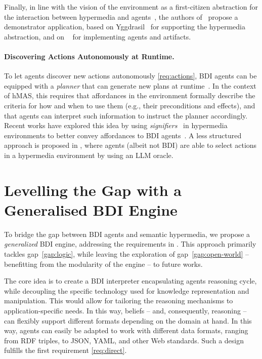 \documentclass[
]{ceurart}
\begin{document}
Finally,
in line with the vision of the environment as a first-citizen abstraction for the interaction between hypermedia and agents~\cite{DBLP:conf/www/CharpenayZLB22},
the authors of~\cite{DBLP:conf/emas/CiorteaBR18} propose a demonstrator application,
based on Yggdrasil~\cite{ciortea2018emas} for supporting the hypermedia abstraction,
and on \jacamo{}~\cite{BOISSIER2013747} for implementing agents and artifacts.

\paragraph{Discovering Actions Autonomously at Runtime.}

To let agents discover new actions autonomously \ref{req:actions},
\ac{BDI} agents can be equipped with a \emph{planner} that can generate new plans at runtime~\cite{MeneguzziS15}.
%
In the context of \ac{hMAS}, 
this requires that affordances in the environment 
formally describe the criteria for how and when to use them 
(e.g., their preconditions and effects),
and that agents can interpret such information to instruct the planner accordingly.
%
Recent works have explored this idea by using \emph{signifiers}~\cite{vachtsevanou2023atal} in hypermedia environments to better convey affordances to \ac{BDI} agents~\cite{vachtsevanou2024atal}.
%
A less structured approach is proposed in \cite{10.1145/3603163.3609077,schmid2024kgswc},
where agents (albeit not \ac{BDI}) are able to select actions in a hypermedia environment by using an \ac{LLM} oracle.

\section{Levelling the Gap with a Generalised \ac{BDI} Engine}
\label{sec:generalized-bdi-engine}

To bridge the gap between \ac{BDI} agents and semantic hypermedia,
we propose a \emph{generalized} \ac{BDI} engine,
addressing the requirements in .
%
This approach primarily tackles gap~\ref{gap:logic}, while leaving the exploration of gap~\ref{gap:open-world} -- benefitting from the modularity of the engine -- to future works.

The core idea is to create a \ac{BDI} interpreter encapsulating agents reasoning cycle,
while decoupling the specific technology used for knowledge representation and manipulation.
%
This would allow for tailoring the reasoning mechanisms to application-specific needs.
%
In this way,
beliefs
-- and, consequently, reasoning --
can flexibly support different formats depending on the domain at hand.
%
In this way,
agents can easily be adapted to work with different data formats,
ranging from \ac{RDF} triples, to JSON, YAML, and other Web standards.
%
Such a design fulfills the first requirement \ref{req:direct}.
\end{document}
